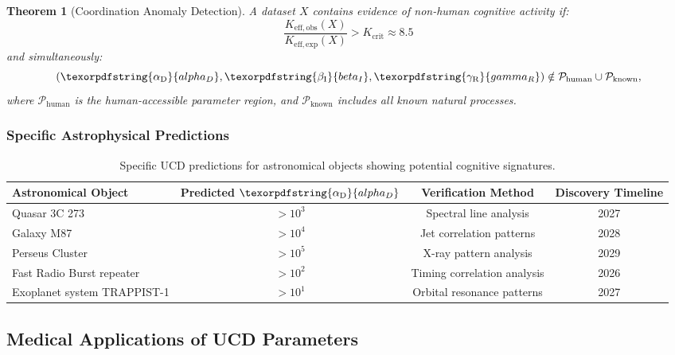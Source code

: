 \documentclass[12pt,a4paper]{article}
\newtheorem{theorem}{Theorem}
\DeclareRobustCommand{\alD}{\texorpdfstring{\ensuremath{\alpha_{\mathrm{D}}}}{alpha_D}}
\DeclareRobustCommand{\beI}{\texorpdfstring{\ensuremath{\beta_{\mathrm{I}}}}{beta_I}}
\DeclareRobustCommand{\gaR}{\texorpdfstring{\ensuremath{\gamma_{\mathrm{R}}}}{gamma_R}}
\newcommand{\eff}{\mathrm{eff}}
\newcommand{\Keobs}{K_{\eff,\mathrm{obs}}}
\newcommand{\Keexp}{K_{\eff,\mathrm{exp}}}
\newcommand{\Kcrit}{K_{\mathrm{crit}}}
\begin{document}
	\begin{theorem}[Coordination Anomaly Detection]
		A dataset \(X\) contains evidence of non-human cognitive activity if:
		\[
		\frac{\Keobs(X)}{\Keexp(X)} > \Kcrit \approx 8.5
		\]
		and simultaneously:
		\[
		(\alD, \beI, \gaR) \notin \mathcal{P}_{\mathrm{human}} \cup \mathcal{P}_{\mathrm{known}},
		\]
		where \(\mathcal{P}_{\mathrm{human}}\) is the human-accessible parameter region, and \(\mathcal{P}_{\mathrm{known}}\) includes all known natural processes.
	\end{theorem}
	
	\subsubsection{Specific Astrophysical Predictions}
	
	\begin{table}[ht]
		\centering
		\scriptsize
		\begin{tabular}{lccc}
			\toprule
			\textbf{Astronomical Object} & \textbf{Predicted \(\alD\)} & \textbf{Verification Method} & \textbf{Discovery Timeline} \\
			\midrule
			Quasar 3C 273 & \(>10^3\) & Spectral line analysis & 2027 \\
			Galaxy M87 & \(>10^4\) & Jet correlation patterns & 2028 \\
			Perseus Cluster & \(>10^5\) & X-ray pattern analysis & 2029 \\
			Fast Radio Burst repeater & \(>10^2\) & Timing correlation analysis & 2026 \\
			Exoplanet system TRAPPIST-1 & \(>10^1\) & Orbital resonance patterns & 2027 \\
			\bottomrule
		\end{tabular}
		\caption{Specific UCD predictions for astronomical objects showing potential cognitive signatures.}
		\label{tab:astro-predictions}
	\end{table}
	
	\subsection{Medical Applications of UCD Parameters}
	
\end{document}
